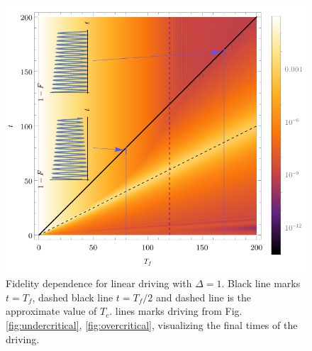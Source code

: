 \begin{figure}[H]
    \centering 
    \includegraphics[scale=1.2]{../img/allInOne.pdf}
    \caption{Fidelity dependence for linear driving with $\Delta=1$. Black line marks $t=T_f$, dashed black line $t=T_f/2$ and  dashed line is the approximate value of $T_c$.  lines marks driving from Fig. \ref{fig:undercritical}, \ref{fig:overcritical}, visualizing the final times of the driving.}
    \label{fig:AllInOne}
\end{figure}









\newpage
